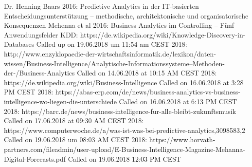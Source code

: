 \documentclass[12pt,twocolumn,twoside]{conference}   %
\begin{document}
\begin{thebibliography}{99}
	Dr. Henning Baars 2016: Predictive Analytics in der IT-basierten Entscheidungsunterstützung – methodische, architektonische und organisatorische Konsequenzen
	Mehenna et al 2016: Business Analytics im Controlling – Fünf Anwendungsfelder
	KDD: https://de.wikipedia.org/wiki/Knowledge-Discovery-in-Databases
	Called up on 19.06.2018 um 11:54 am CEST
	2018: http://www.enzyklopaedie-der-wirtschaftsinformatik.de/lexikon/daten-wissen/Business-Intelligence/Analytische-Informationssysteme--Methoden-der-/Business-Analytics
Called on 14.06.2018 at 10:15 AM CEST
2018: https://de.wikipedia.org/wiki/Business-Intelligence Called on 16.06.2018 at  3:28 PM CEST
2018: https://abas-erp.com/de/news/business-analytics-vs-business-intelligence-wo-liegen-die-unterschiede Called on 16.06.2018 at 6:13 PM CEST
2018: https://barc.de/news/business-intelligence-fur-alle-bleibt-zukunftsmusik
Called on 17.06.2018 at 09:30 AM CEST
2018: https://www.computerwoche.de/a/was-ist-was-bei-predictive-analytics,3098583,2
Called on 19.06.2018 um 08:03 AM CEST
2018: https://www.horvath-partners.com/fileadmin/user-upload/E-Business-Intelligence-Magazine-Mehanna-Digital-Forecasts.pdf
Called on 19.06.2018 12:03 PM CEST

\end{thebibliography}

\listoffigures
\end{document}

